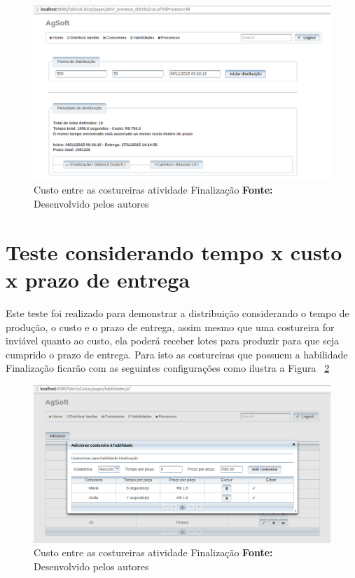 \begin{figure}[h!]
	\centerline{\includegraphics[scale=0.4]{./imagens/resultado_tudo_igual_teste2.png}}
	\caption[Custo entre as costureiras atividade Finalização]
	{Custo entre as costureiras atividade Finalização \textbf{Fonte:} Desenvolvido pelos autores}
	\label{fig:resultado_tudo_igual}
\end{figure}

\section{Teste considerando tempo x custo x prazo de entrega}

\par Este teste foi realizado para demonstrar a distribuição considerando o tempo de
produção, o custo e o prazo de entrega, assim mesmo que uma costureira for inviável 
quanto ao custo, ela poderá receber lotes para produzir para que seja cumprido o prazo 
de entrega. Para isto as costureiras que possuem a habilidade Finalização ficarão com
as seguintes configurações como ilustra a Figura ~\ref{fig:configuracao_habilidade_costureira_teste3}

\newpage

\begin{figure}[h!]
	\centerline{\includegraphics[scale=0.4]{./imagens/cofiguracao_habilidade_teste3.png}}
	\caption[Custo entre as costureiras atividade Finalização]
	{Custo entre as costureiras atividade Finalização \textbf{Fonte:} Desenvolvido pelos autores}
	\label{fig:configuracao_habilidade_costureira_teste3}
\end{figure}


